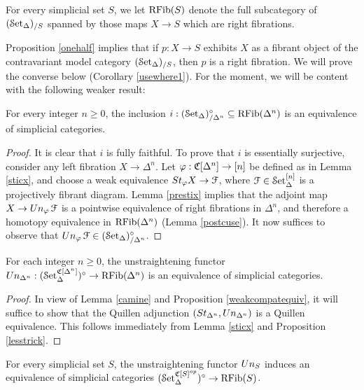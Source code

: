 \begin{notation}
For every simplicial set $S$, we let $\operatorname{RFib}(S)$ denote the full subcategory
of $( \operatorname{\mathcal{S}et_{\Delta}})_{/S}$ spanned by those maps $X \rightarrow S$ which are right fibrations.
\end{notation}

Proposition \ref{onehalf} implies that if $p: X \rightarrow S$ exhibits $X$ as a fibrant
object of the contravariant model category $(\operatorname{\mathcal{S}et_{\Delta}})_{/S}$, then $p$ is a right fibration. We will
prove the converse below (Corollary \ref{usewhere1}). For the moment, we will be content with the following weaker result:

\begin{lemma}\label{camine}
For every integer $n \geq 0$, the inclusion
$i: (\operatorname{\mathcal{S}et_{\Delta}})_{/\Delta^n}^{\circ} \subseteq \operatorname{RFib}( \Delta^n)$ is an equivalence of simplicial
categories.
\end{lemma}

\begin{proof}
It is clear that $i$ is fully faithful. To prove that $i$ is essentially surjective, consider
any left fibration $X \rightarrow \Delta^n$. Let $\varphi: \operatorname{\mathfrak{C}}[ \Delta^n ] \rightarrow [n]$
be defined as in Lemma \ref{sticx}, and choose a weak equivalence
$St_{\varphi} X \rightarrow \operatorname{\mathcal{F}}$, where $\operatorname{\mathcal{F}} \in \operatorname{\mathcal{S}et}_{\Delta}^{[n]}$ is a projectively fibrant
diagram. Lemma \ref{prestix} implies that the adjoint map
$X \rightarrow Un_{\varphi} \operatorname{\mathcal{F}}$ is a pointwise equivalence of right fibrations in $\Delta^n$, and
therefore a homotopy equivalence in $\operatorname{RFib}( \Delta^n)$ (Lemma \ref{postcuse}). 
It now suffices to observe that $Un_{\varphi} \operatorname{\mathcal{F}} \in ( \operatorname{\mathcal{S}et_{\Delta}})_{/\Delta^n}^{\circ}$.
\end{proof}

\begin{lemma}\label{stucks}
For each integer $n \geq 0$, the unstraightening functor
$Un_{\Delta^n}: (\operatorname{\mathcal{S}et}_{\Delta}^{\operatorname{\mathfrak{C}}[\Delta^n]})^{\circ} \rightarrow \operatorname{RFib}(\Delta^n)$ is
an equivalence of simplicial categories.
\end{lemma}

\begin{proof}
In view of Lemma \ref{camine} and Proposition \ref{weakcompatequiv}, it will suffice to show that
the Quillen adjunction $( St_{\Delta^n}, Un_{\Delta^n} )$ is a Quillen equivalence. This follows
immediately from Lemma \ref{sticx} and Proposition \ref{lesstrick}.
\end{proof}

\begin{proposition}\label{fullmeal}
For every simplicial set $S$, the unstraightening functor 
$Un_{S}$ induces an equivalence of simplicial categories
$(\operatorname{\mathcal{S}et}_{\Delta}^{\operatorname{\mathfrak{C}}[S]^{op}})^{\circ} \rightarrow \operatorname{RFib}(S)$.
\end{proposition}

